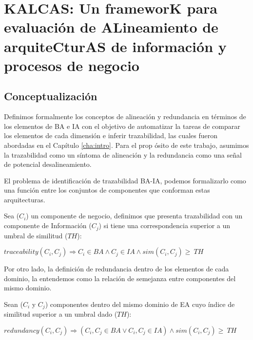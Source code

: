\chapter{KALCAS: Un frameworK para evaluaci\'on de ALineamiento de arquiteCturAS de informaci\'on y procesos de negocio} \label{cha:solution}

\section{Conceptualizaci\'on} \label{sec:conceptualization}
Definimos formalmente los conceptos de alineaci\'on y redundancia en t\'erminos de los elementos de BA e IA con el objetivo de automatizar la tareas de comparar los elementos de cada dimensi\'on e inferir trazabilidad, las cuales fueron abordadas en el Cap\'itulo \ref{cha:intro}. Para el prop \'osito de este trabajo, asumimos la trazabilidad como un s\'intoma de alineaci\'on y la redundancia como una se\~nal de potencial desalineamiento.

El problema de identificaci\'on de trazabilidad BA-IA, podemos formalizarlo como una funci\'on entre los conjuntos de componentes que conforman estas arquitecturas.

\begin{theorem}
\label{def:traceability}
Sea ($C_{i}$) un componente de negocio, definimos que presenta trazabilidad con un componente de Informaci\'on ($C_{j}$) si tiene una correspondencia superior a un umbral de similitud ($TH$):
\begin{center}
\begin{math}
traceability(C_{i},C_{j}) \Longrightarrow C_{i} \in BA \wedge C_{j} \in IA \wedge sim(C_{i},C_{j}) \geq\ TH
\end{math}
\end{center}
\end{theorem}

Por otro lado, la definici\'on de redundancia dentro de los elementos de cada dominio, la entendemos como la relaci\'on de semejanza entre componentes del mismo dominio.

\begin{theorem}
\label{def:redundancy}
Sean ($C_{i}$ y $C_{j}$) componentes dentro del mismo dominio de EA cuyo \'indice de similitud superior a un umbral dado ($TH$): 
\begin{center}
\begin{math}
redundancy(C_{i},C_{j}) \Longrightarrow (C_{i}, C_{j} \in BA \vee C_{i}, C_{j} \in IA ) \wedge sim(C_{i},C_{j}) \geq\ TH
\end{math}
\end{center}
\end{theorem}

